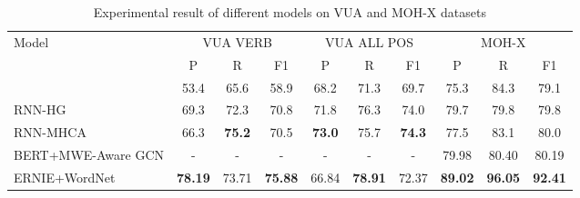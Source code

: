 \documentclass[11pt,a4paper]{article}
\begin{document}
\begin{table}[!htbp]
\begin{tabular}{lllllllllll|llllllllllll|llllllllllll|llllllllllll}
\hline
\multicolumn{11}{l|}{{Model}} & \multicolumn{12}{c|}{{VUA VERB}}  & \multicolumn{12}{c|}{{VUA ALL POS}} & \multicolumn{12}{c}{{MOH-X}} \\
\multicolumn{11}{l|}{{\quad}}   &\multicolumn{4}{c}{{P}} & \multicolumn{4}{c}{{R}} & \multicolumn{4}{c|}{{F1}}  & \multicolumn{4}{c}{{P}} & \multicolumn{4}{c}{{R}} & \multicolumn{4}{c|}{{F1}} &\multicolumn{4}{c}{{P}} & \multicolumn{4}{c}{{R}} & \multicolumn{4}{c}{{F1}} \\ \hline
\multicolumn{11}{l|}{\citet{gao2018neural}} &\multicolumn{4}{c}{{53.4}} & \multicolumn{4}{c}{{65.6}} & \multicolumn{4}{c|}{{58.9}}  &\multicolumn{4}{c}{{68.2}} & \multicolumn{4}{c}{{71.3}} & \multicolumn{4}{c|}{{69.7}}   &\multicolumn{4}{c}{{75.3}} & \multicolumn{4}{c}{{84.3}} & \multicolumn{4}{c}{{79.1}} \\
\multicolumn{11}{l|}{RNN-HG} &\multicolumn{4}{c}{{69.3}} & \multicolumn{4}{c}{{72.3}} & \multicolumn{4}{c|}{{70.8}}  &\multicolumn{4}{c}{{71.8}} &\multicolumn{4}{c}{{76.3}} & \multicolumn{4}{c|}{{74.0}}   &\multicolumn{4}{c}{{79.7}} & \multicolumn{4}{c}{{79.8}} & \multicolumn{4}{c}{{79.8}}\\
\multicolumn{11}{l|}{RNN-MHCA}  &\multicolumn{4}{c}{{66.3}} & \multicolumn{4}{c}{\textbf{75.2}} & \multicolumn{4}{c|}{{70.5}}  &\multicolumn{4}{c}{\textbf{73.0}} &\multicolumn{4}{c}{{75.7}} & \multicolumn{4}{c|}{\textbf{74.3}}    &\multicolumn{4}{c}{{77.5}} & \multicolumn{4}{c}{{ 83.1}} & \multicolumn{4}{c}{{ 80.0}}\\ 
\multicolumn{11}{l|}{BERT+MWE-Aware GCN}   &\multicolumn{4}{c}{{-}} &\multicolumn{4}{c}{{-}} & \multicolumn{4}{c|}{{-}}   &\multicolumn{4}{c}{{-}} & \multicolumn{4}{c}{{-}} & \multicolumn{4}{c|}{{-}}&\multicolumn{4}{c}{{79.98}} & \multicolumn{4}{c}{{80.40}} & \multicolumn{4}{c}{{80.19}}\\ \hline
\multicolumn{11}{l|}{ERNIE+WordNet} &\multicolumn{4}{c}{\textbf{78.19}} & \multicolumn{4}{c}{{73.71}} & \multicolumn{4}{c|}{\textbf{75.88}}  &\multicolumn{4}{c}{{66.84}} &\multicolumn{4}{c}{\textbf{78.91}} & \multicolumn{4}{c|}{{72.37}}    &\multicolumn{4}{c}{\textbf{89.02 }} & \multicolumn{4}{c}{\textbf{ 96.05}} & \multicolumn{4}{c}{\textbf{ 92.41}}
\end{tabular}
\caption{Experimental result of different models on VUA and MOH-X datasets}
\label{table1}
\end{table}
\end{document}
